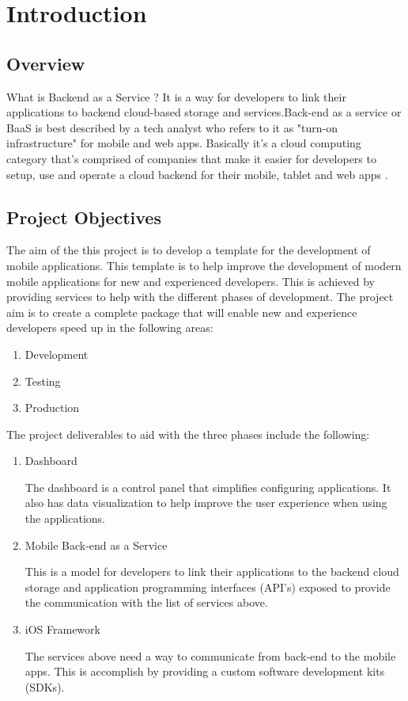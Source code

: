 \chapter{Introduction}

\section{Overview}

What is Backend as a Service ? It is a way for developers to link their applications to backend cloud-based storage and services.Back-end as a service or BaaS is best described by a tech analyst who refers to it as "turn-on infrastructure" for mobile and web apps. Basically it's a cloud computing category that's comprised of companies that make it easier for developers to setup, use and operate a cloud backend for their mobile, tablet and web apps \cite{kinveywebsite}.  

\section{Project Objectives}
The aim of the this project is to develop a template for the development of mobile applications. This template is to help improve the development of modern mobile applications for new and experienced developers. This is achieved by providing services to help with the different phases of development. The project aim is to create a complete package that will enable new and experience developers speed up in the following areas:

\begin{enumerate}
  \item Development
  \item Testing 
  \item Production
\end{enumerate}

The project deliverables to aid with the three phases include the following:

\begin{enumerate}
  \item Dashboard
  
    The dashboard is a control panel that simplifies configuring applications. It also has data visualization to help improve the user experience when using the applications.
  \item Mobile Back-end as a Service
  
    This is a model for developers to link their applications to the backend cloud storage and application programming interfaces (API's) exposed to provide the communication with the list of services above.
  \item iOS Framework
  
    The services above need a way to communicate from back-end to the mobile apps. This is accomplish by providing a custom software development kits (SDKs).
\end{enumerate}

